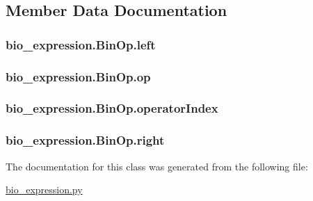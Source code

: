 \subsection{Member Data Documentation}
\hypertarget{classbio__expression_1_1_bin_op_ac423b3a4a34de6ac276487e87863daf5}{
\subsubsection[{left}]{\setlength{\rightskip}{0pt plus 5cm}bio\+\_\+expression.\+Bin\+Op.\+left}}\label{classbio__expression_1_1_bin_op_ac423b3a4a34de6ac276487e87863daf5}
\hypertarget{classbio__expression_1_1_bin_op_a3839086f0be1bb27fe19fd22ab9bfadc}{
\subsubsection[{op}]{\setlength{\rightskip}{0pt plus 5cm}bio\+\_\+expression.\+Bin\+Op.\+op}}\label{classbio__expression_1_1_bin_op_a3839086f0be1bb27fe19fd22ab9bfadc}
\hypertarget{classbio__expression_1_1_bin_op_aabcd96f55bc50e5e3f09406de8a42c65}{
\subsubsection[{operator\+Index}]{\setlength{\rightskip}{0pt plus 5cm}bio\+\_\+expression.\+Bin\+Op.\+operator\+Index}}\label{classbio__expression_1_1_bin_op_aabcd96f55bc50e5e3f09406de8a42c65}
\hypertarget{classbio__expression_1_1_bin_op_aa301b38f79504a875746a683dfe02811}{
\subsubsection[{right}]{\setlength{\rightskip}{0pt plus 5cm}bio\+\_\+expression.\+Bin\+Op.\+right}}\label{classbio__expression_1_1_bin_op_aa301b38f79504a875746a683dfe02811}


The documentation for this class was generated from the following file\+:\begin{DoxyCompactItemize}
\item 
\hyperlink{bio__expression_8py}{bio\+\_\+expression.\+py}\end{DoxyCompactItemize}
